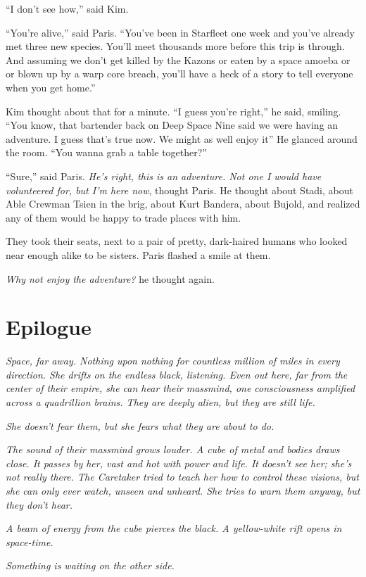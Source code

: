 \documentclass[twoside,letterpaper,12pt]{memoir}
\begin{document}
``I don’t see how,'' said Kim. 

``You’re alive,'' said Paris. ``You’ve been in Starfleet one week and you’ve already met three new species. You’ll meet thousands more before this trip is through. And assuming we don’t get killed by the Kazons or eaten by a space amoeba or or blown up by a warp core breach, you’ll have a heck of a story to tell everyone when you get home.'' 

Kim thought about that for a minute. ``I guess you’re right,'' he said, smiling. ``You know, that bartender back on Deep Space Nine said we were having an adventure. I guess that’s true now. We might as well enjoy it'' He glanced around the room. ``You wanna grab a table together?'' 

``Sure,'' said Paris. \textit{He’s right, this is an adventure. Not one I would have volunteered for, but I’m here now}, thought Paris. He thought about Stadi, about Able Crewman Tsien in the brig, about Kurt Bandera, about Bujold, and realized any of them would be happy to trade places with him. 

They took their seats, next to a pair of pretty, dark-haired humans who looked near enough alike to be sisters. Paris flashed a smile at them. 

\textit{Why not enjoy the adventure? }he thought again. 

\chapter*{Epilogue}

\textit{Space, far away. Nothing upon nothing for countless million of miles in every direction. She drifts on the endless black, listening. Even out here, far from the center of their empire, she can hear their massmind, one consciousness amplified across a quadrillion brains. They are deeply alien, but they are still life.} 

\textit{She doesn’t fear them, but she fears what they are about to do.} 

\textit{The sound of their massmind grows louder. A cube of metal and bodies draws close. It passes by her, vast and hot with power and life. It doesn’t see her; she’s not really there. The Caretaker tried to teach her how to control these visions, but she can only ever watch, unseen and unheard. She tries to warn them anyway, but they don't hear.} 

\textit{A beam of energy from the cube pierces the black. A yellow-white rift opens in space-time.} 

\textit{Something is waiting on the other side.}
\end{document}

